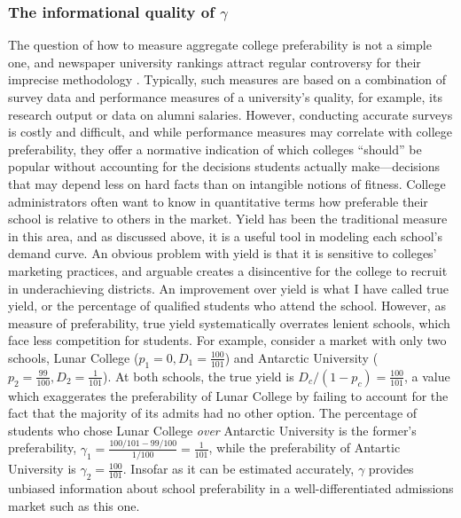 \documentclass[12pt]{article}
\theoremstyle{definition}
\begin{document}
\subsubsection{The informational quality of $\gamma$}
The question of how to measure aggregate college preferability is not a simple one, and newspaper university rankings attract regular controversy for their imprecise methodology \parencite[][]{intlrankingsandconflicts}. Typically, such measures are based on a combination of survey data and performance measures of a university's quality, for example, its research output or data on alumni salaries. However, conducting accurate surveys is costly and difficult, and while performance measures may correlate with college preferability, they offer a normative indication of which colleges ``should'' be popular without accounting for the decisions students actually make---decisions that may depend less on hard facts than on intangible notions of fitness. College administrators often want to know in quantitative terms how preferable their school is relative to others in the market. Yield has been the traditional measure in this area, and as discussed above, it is a useful tool in modeling each school's demand curve. An obvious problem with yield is that it is sensitive to colleges' marketing practices, and arguable creates a disincentive for the college to recruit in underachieving districts. An improvement over yield is what I have called true yield, or the percentage of qualified students who attend the school. However, as measure of preferability, true yield systematically overrates lenient schools, which face less competition for students. For example, consider a market with only two schools, Lunar College ($p_1 = 0, D_1 =  \frac{100}{101}$) and Antarctic University ($p_2 = \frac{99}{100}, D_2 = \frac{1}{101}$). At both schools, the true yield is $D_c / (1 - p_c) = \frac{100}{101}$, a value which exaggerates the preferability of Lunar College by failing to account for the fact that the majority of its admits had no other option. The percentage of students who chose Lunar College \emph{over} Antarctic University is the former's preferability, $\gamma_1 = \frac{100/101 - 99/100}{1/100} = \frac{1}{101}$, while the preferability of Antartic University is $\gamma_2 = \frac{100}{101}$. Insofar as it can be estimated accurately, $\gamma$ provides unbiased information about school preferability in a well-differentiated admissions market such as this one. 
\end{document}
